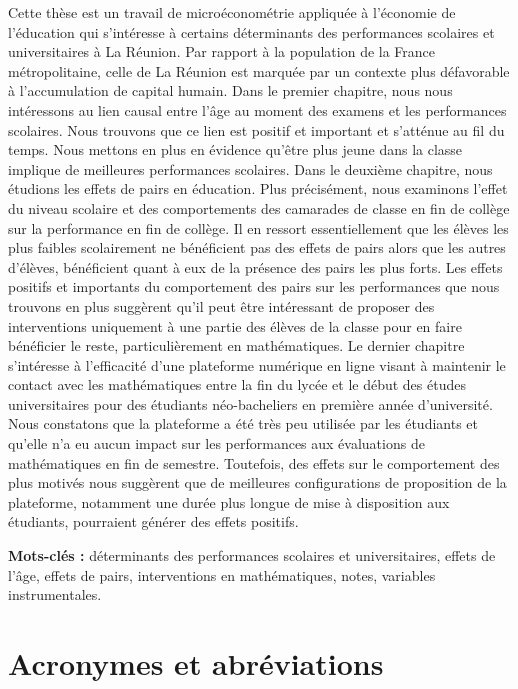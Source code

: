 \documentclass[
]{book}
\begin{document}
Cette thèse est un travail de microéconométrie appliquée à l'économie de l'éducation qui s'intéresse à certains déterminants des performances scolaires et universitaires à La Réunion. Par rapport à la population de la France métropolitaine, celle de La Réunion est marquée par un contexte plus défavorable à l'accumulation de capital humain. Dans le premier chapitre, nous nous intéressons au lien causal entre l'âge au moment des examens et les performances scolaires. Nous trouvons que ce lien est positif et important et s'atténue au fil du temps. Nous mettons en plus en évidence qu'être plus jeune dans la classe implique de meilleures performances scolaires. Dans le deuxième chapitre, nous étudions les effets de pairs en éducation. Plus précisément, nous examinons l'effet du niveau scolaire et des comportements des camarades de classe en fin de collège sur la performance en fin de collège. Il en ressort essentiellement que les élèves les plus faibles scolairement ne bénéficient pas des effets de pairs alors que les autres d'élèves, bénéficient quant à eux de la présence des pairs les plus forts. Les effets positifs et importants du comportement des pairs sur les performances que nous trouvons en plus suggèrent qu'il peut être intéressant de proposer des interventions uniquement à une partie des élèves de la classe pour en faire bénéficier le reste, particulièrement en mathématiques. Le dernier chapitre s'intéresse à l'efficacité d'une plateforme numérique en ligne visant à maintenir le contact avec les mathématiques entre la fin du lycée et le début des études universitaires pour des étudiants néo-bacheliers en première année d'université. Nous constatons que la plateforme a été très peu utilisée par les étudiants et qu'elle n'a eu aucun impact sur les performances aux évaluations de mathématiques en fin de semestre. Toutefois, des effets sur le comportement des plus motivés nous suggèrent que de meilleures configurations de proposition de la plateforme, notamment une durée plus longue de mise à disposition aux étudiants, pourraient générer des effets positifs.

\textbf{Mots-clés : } déterminants des performances scolaires et universitaires, effets de l'âge, effets de pairs, interventions en mathématiques, notes, variables instrumentales.

\hypertarget{acronymes-et-abruxe9viations}{%
\chapter*{Acronymes et abréviations}\label{acronymes-et-abruxe9viations}}
\end{document}
